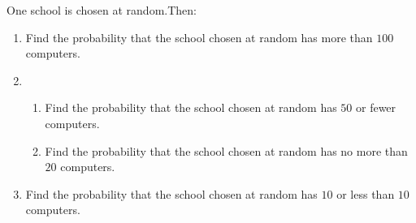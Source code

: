 \documentclass[12pt,-letter paper]{article}
\begin{document}
\begin{enumerate}
	\text One school is chosen at random.Then:
	\begin{enumerate}
		\item  Find the probability that the school chosen at random has more than $100$ computers.
		\item
		\begin{enumerate}
			\item  Find the probability that the school chosen at random has $50$ or fewer computers.
			\item  Find the probability that the school chosen at random has no more than $20$ computers.
		\end{enumerate}
		\item  Find the probability that the school chosen at random has $10$ or less than $10$ computers.
	\end{enumerate}


\end{enumerate}
\end{document}
